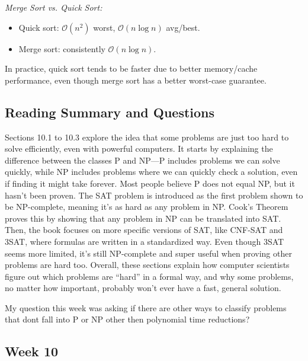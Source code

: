 \documentclass{article}
\theoremstyle{theorem}
\theoremstyle{definition}
\theoremstyle{remark}
\begin{document}
\textit{Merge Sort vs. Quick Sort:}
\begin{itemize}
    \item Quick sort: $\mathcal{O}(n^2)$ worst, $\mathcal{O}(n \log n)$ avg/best.
    \item Merge sort: consistently $\mathcal{O}(n \log n)$.
\end{itemize}

\noindent In practice, quick sort tends to be faster due to better memory/cache performance, even though merge sort has a better worst-case guarantee.

\subsection*{Reading Summary and Questions}
Sections 10.1 to 10.3 explore the idea that some problems are just too hard to solve efficiently, even with powerful computers. It starts by explaining the 
difference between the classes P and NP—P includes problems we can solve quickly, while NP includes problems where we can quickly check a solution, even if 
finding it might take forever. Most people believe P does not equal NP, but it hasn’t been proven. The SAT problem is introduced as the first problem shown to be NP-complete, 
meaning it’s as hard as any problem in NP. Cook’s Theorem proves this by showing that any problem in NP can be translated into SAT. Then, the book focuses on 
more specific versions of SAT, like CNF-SAT and 3SAT, where formulas are written in a standardized way. Even though 3SAT seems more limited, it’s still NP-complete 
and super useful when proving other problems are hard too. Overall, these sections explain how computer scientists figure out which problems are “hard” in a formal 
way, and why some problems, no matter how important, probably won’t ever have a fast, general solution.

My question this week was asking if there are other ways to classify problems that dont fall into P or NP other then polynomial time reductions?

\subsection{Week 10}
\smallskip
\end{document}
